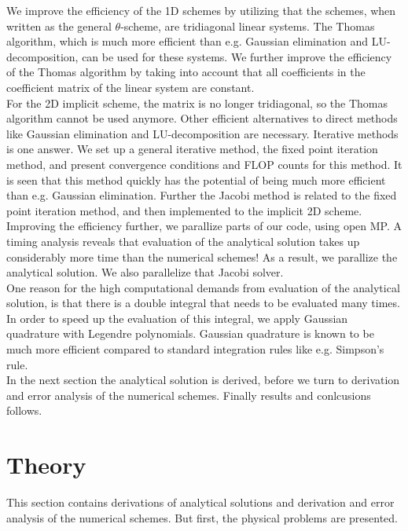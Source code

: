 \documentclass{article}
\begin{document}
We improve the efficiency of the 1D schemes by utilizing that the schemes, when written as the general $\theta$-scheme, are tridiagonal linear systems. The Thomas algorithm, which is much more efficient than e.g. Gaussian elimination and LU-decomposition, can be used for these systems. We further improve the efficiency of the Thomas algorithm by taking into account that all coefficients in the coefficient matrix of the linear system are constant.\\

For the 2D implicit scheme, the matrix is no longer tridiagonal, so the Thomas algorithm cannot be used anymore. Other efficient alternatives to direct methods like Gaussian elimination and LU-decomposition are necessary. Iterative methods is one answer. We set up a general iterative method, the fixed point iteration method, and present convergence conditions and FLOP counts for this method. It is seen that this method quickly has the potential of being much more efficient than e.g. Gaussian elimination. Further the Jacobi method is related to the fixed point iteration method, and then implemented to the implicit 2D scheme.\\

Improving the efficiency further, we parallize parts of our code, using open MP. A timing analysis reveals that evaluation of the analytical solution takes up considerably more time than the numerical schemes! As a result, we parallize the analytical solution. We also parallelize that Jacobi solver. \\

One reason for the high computational demands from evaluation of the analytical solution, is that there is a double integral that needs to be evaluated many times. In order to speed up the evaluation of this integral, we apply Gaussian quadrature with Legendre polynomials. Gaussian quadrature is known to be much more efficient compared to standard integration rules like e.g. Simpson's rule.\\

In the next section the analytical solution is derived, before we turn to derivation and error analysis of the numerical schemes. Finally results and conlcusions follows.

\section{Theory}
This section contains derivations of analytical solutions and derivation and error analysis of the numerical schemes. But first, the physical problems are presented.
\end{document}
